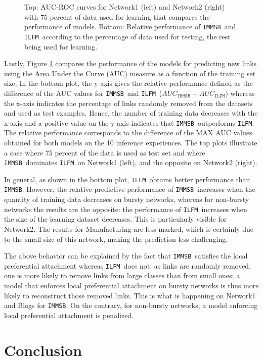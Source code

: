 \documentclass[journal]{IEEEtran}
\newcommand{\ifm}{\texttt{ILFM}}
\newcommand{\imb}{\texttt{IMMSB}}
\begin{document}
\begin{figure}[h]
\begin{minipage}{0.5\textwidth}
    \end{minipage}
    \caption{Top: AUC-ROC curves for Network1 (left) and Network2 (right) with 75 percent of data used for learning that compares the performance of models. Bottom: Relative performance of \imb\ and \ifm\ according to the percentage of data used for testing, the rest being used for learning.} 
\label{fig:auc}
\end{figure}

Lastly, Figure \ref{fig:auc} compares the performance of the models for predicting new links using the Area Under the Curve (AUC) measure as a function of the training set size. In the bottom plot, the y-axis gives the relative performance defined as the difference of the AUC values for \imb\ and \ifm\ ($AUC_{\imb} - AUC_{\ifm}$) whereas the x-axis indicates the percentage of links randomly removed from the datasets and used as test examples. Hence, the number of training data decreases with the x-axis and a positive value on the y-axis indicates that \imb\ outperforms \ifm.  The relative performance corresponds to the difference of the MAX AUC values obtained for both models on the 10 inference experiences. The top plots illustrate a case where 75 percent of the data is used as test set and where \imb\ dominates \ifm\ on Network1 (left), and the opposite on Network2 (right).

In general, as shown in the bottom plot, \ifm\ obtains better performance than \imb. However, the relative predictive performance of \imb\  increases  when the quantity of training data decreases on bursty networks, whereas for non-bursty networks the results are the opposite: the performance of \ifm\ increases when the size of the learning dataset decreases. This is particularly visible for Network2. The results for Manufacturing are less marked, which is certainly due to the small size of this network, making the prediction less challenging.

The above behavior can be explained by the fact that \imb\ satisfies the local preferential attachment whereas \ifm\ does not: as links are randomly removed, one is more likely to remove links from large classes than from small ones; a model that enforces local preferential attachment on bursty networks is thus more likely to reconstruct those removed links. This is what is happening on Network1 and Blogs for \imb. On the contrary, for non-bursty networks, a model enforcing local preferential attachment is penalized.

\section{Conclusion}
\label{sec:concl}
\end{document}
